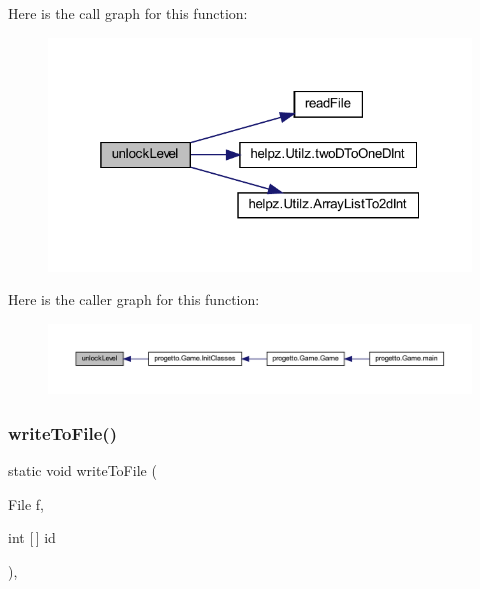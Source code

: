 Here is the call graph for this function\+:\nopagebreak
\begin{figure}[H]
\begin{center}
\leavevmode
\includegraphics[width=319pt]{classhelpz_1_1_load_save_a1369888f20d8279b649d556082d38e72_cgraph}
\end{center}
\end{figure}
Here is the caller graph for this function\+:\nopagebreak
\begin{figure}[H]
\begin{center}
\leavevmode
\includegraphics[width=350pt]{classhelpz_1_1_load_save_a1369888f20d8279b649d556082d38e72_icgraph}
\end{center}
\end{figure}
\mbox{\label{classhelpz_1_1_load_save_a953963a355bc62c6a3c1fdb51851d796}} 
\subsubsection{\texorpdfstring{write\+To\+File()}{writeToFile()}}
{\footnotesize\ttfamily static void write\+To\+File (\begin{DoxyParamCaption}\item[{File}]{f,  }\item[{int \mbox{[}$\,$\mbox{]}}]{id }\end{DoxyParamCaption})\hspace{0.3cm}{\ttfamily [static]}, {\ttfamily [private]}}



